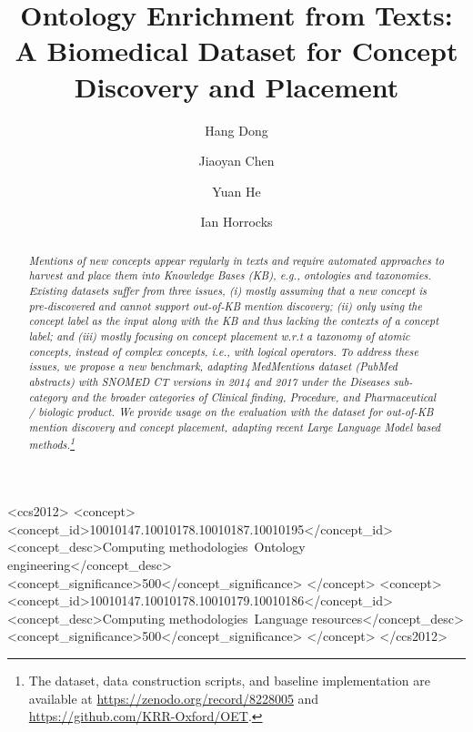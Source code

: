\documentclass[sigconf]{acmart}
\begin{document}
	\title{ 
		Ontology Enrichment from Texts: A Biomedical Dataset for Concept Discovery and Placement}
	
	\author{Hang Dong}
	
	\author{Jiaoyan Chen}
	
	\author{Yuan He}
	
	\author{Ian Horrocks}
	
	\renewcommand{\shortauthors}{Hang Dong, Jiaoyan Chen, Yuan He, \& Ian Horrocks}
	
	\begin{abstract}
		\noindent\textit{Mentions of new concepts appear regularly in texts and require automated approaches to harvest and place them into Knowledge Bases (KB), e.g., ontologies and taxonomies. Existing datasets suffer from three issues, (i) mostly assuming that a new concept is pre-discovered and cannot support out-of-KB mention discovery; (ii) only using the concept label as the input along with the KB and thus lacking the contexts of a concept label; and (iii) mostly focusing on concept placement w.r.t a taxonomy of atomic concepts, instead of complex concepts, i.e., with logical operators. To address these issues, we propose a new benchmark, adapting MedMentions dataset (PubMed abstracts) with SNOMED CT versions in 2014 and 2017 under the Diseases sub-category and the broader categories of Clinical finding, Procedure, and Pharmaceutical / biologic product. We provide usage on the evaluation with the dataset for out-of-KB mention discovery and concept placement, adapting recent Large Language Model based methods.\footnote{The dataset, data construction scripts, and baseline implementation are available at \url{https://zenodo.org/record/8228005} and \url{https://github.com/KRR-Oxford/OET}.}}
	\end{abstract}
	
	\begin{CCSXML}
		<ccs2012>
		<concept>
		<concept_id>10010147.10010178.10010187.10010195</concept_id>
		<concept_desc>Computing methodologies~Ontology engineering</concept_desc>
		<concept_significance>500</concept_significance>
		</concept>
		<concept>
		<concept_id>10010147.10010178.10010179.10010186</concept_id>
		<concept_desc>Computing methodologies~Language resources</concept_desc>
		<concept_significance>500</concept_significance>
		</concept>
		</ccs2012>
	\end{CCSXML}
	
\end{document}
